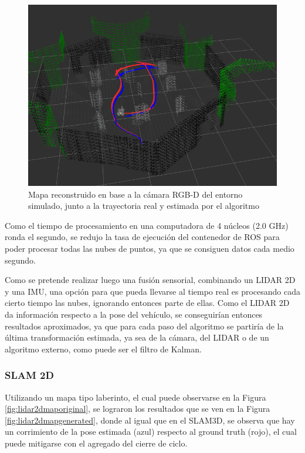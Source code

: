 \begin{figure}[!ht]
    \centering
    \includegraphics[width=\linewidth]{Img/TurtleBotWorldMap3DEstimated.png}%
    \caption{Mapa reconstruido en base a la cámara RGB-D del entorno simulado, junto a la trayectoria real y estimada por el algoritmo}
    \label{fig:turtlebotworldestimatedmap}
\end{figure}
Como el tiempo de procesamiento en una computadora de 4 núcleos (2.0 GHz) ronda el segundo, se redujo la tasa de ejecución del contenedor de ROS para poder procesar todas las nubes de puntos, ya que se consiguen datos cada medio segundo. 

\ifimagenes
Como se pretende realizar luego una fusión sensorial, combinando un LIDAR 2D y una IMU, una opción para que pueda llevarse al tiempo real es procesando cada cierto tiempo las nubes, ignorando entonces parte de ellas. Como el LIDAR 2D da información respecto a la pose del vehículo, se conseguirían entonces resultados aproximados, ya que para cada paso del algoritmo se partiría de la última transformación estimada, ya sea de la cámara, del LIDAR o de un algoritmo externo, como puede ser el filtro de Kalman.
\fi

\subsubsection{SLAM 2D}
Utilizando un mapa tipo laberinto, el cual puede observarse en la Figura \ref{fig:lidar2dmaporiginal}, se lograron los resultados que se ven en la Figura \ref{fig:lidar2dmapgenerated}, donde al igual que en el SLAM3D, se observa que hay un corrimiento de la pose estimada (azul) respecto al ground truth (rojo), el cual puede mitigarse con el agregado del cierre de ciclo.

